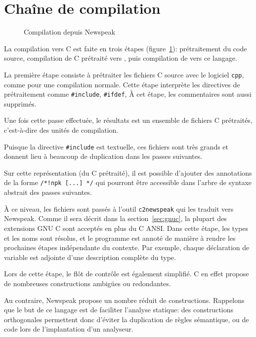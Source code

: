 \section{Chaîne de compilation}
\label{sec:compil}

\begin{figure}
  \centering
  
  \caption{Compilation depuis Newspeak}
\label{fig:compil-npk}
\end{figure}

La compilation vers C est faite en trois étapes (figure~\ref{fig:compil-npk}):
prétraitement du code source, compilation de C prétraité vers \newspeak{}, puis
compilation de \newspeak{} vers ce langage.

La première étape consiste à prétraiter les fichiers C source avec le logiciel
\texttt{cpp}, comme pour une compilation normale. Cette étape interprète les
directives de prétraitement comme \texttt{\#include}, \texttt{\#ifdef}, À cet
étape, les commentaires sont aussi supprimés.

Une fois cette passe effectuée, le résultats est un ensemble de fichiers C
prétraités, c'est-à-dire des unités de compilation.

Puisque la directive \texttt{\#include} est textuelle, ces fichiers sont très
grands et donnent lieu à beaucoup de duplication dans les passes suivantes.

Sur cette représentation (du C prétraité), il est possible d'ajouter des
annotations de la forme \texttt{/*!npk [...] */} qui pourront être accessible
dans l'arbre de syntaxe abstrait des passes suivantes.

À ce niveau, les fichiers sont passés à l'outil \texttt{c2newspeak} qui les
traduit vers Newspeak. Comme il sera décrit dans la section~\ref{sec:gnuc}, la
plupart des extensions GNU C sont acceptés en plus du C ANSI. Dans cette étape,
les types et les noms sont résolus, et le programme est annoté de manière à
rendre les prochaines étapes indépendante du contexte. Par exemple, chaque
déclaration de variable est adjointe d'une description complète du type.

Lors de cette étape, le flôt de contrôle est également simplifié. C en effet
propose de nombreuses constructions ambigües ou redondantes.

Au contraire, Newspeak propose un nombre réduit de constructions. Rappelons que
le but de ce langage est de faciliter l'analyse statique: des constructions
orthogonales permettent donc d'éviter la duplication de règles sémantique, ou de
code lors de l'implantation d'un analyseur.

